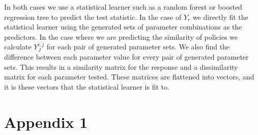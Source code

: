 \documentclass[12pt, a4paper]{article}
\begin{document}
In both cases we use a statistical learner such as a random forest or boosted regression tree to predict the test statistic. In the case of $Y_r$ we directly fit the statistical learner using the generated sets of parameter combinations as the predictors. In the case where we are predicting the similarity of policies we calculate $Y_J^{i,j}$ for each pair of generated parameter sets. We also find the difference between each parameter value for every pair of generated parameter sets. This results in a similarity matrix for the response and a dissimilarity matrix for each parameter tested. These matrices are flattened into vectors, and it is these vectors that the statistical learner is fit to.      





\newpage
\section*{Appendix 1}
\end{document}
